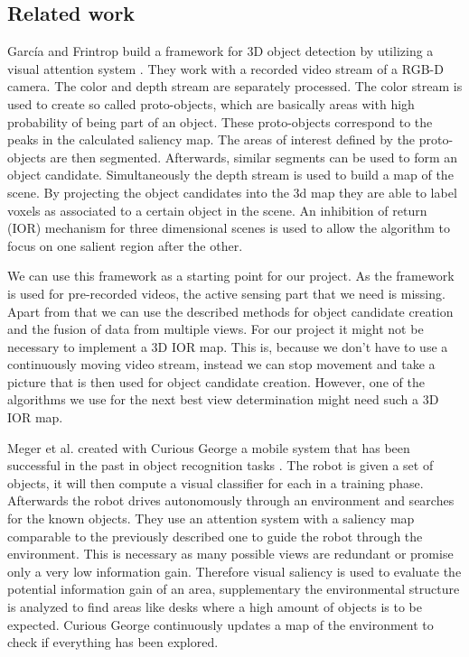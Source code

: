 \documentclass[a4paper,11pt,english]{article}
\begin{document}
\subsection{Related work}
García and Frintrop build a framework for 3D object detection by utilizing a visual attention system \cite{garcia2013computational}.
They work with a recorded video stream of a RGB-D camera. The color and depth stream are separately processed. 
The color stream is used to create so called proto-objects, which are basically areas with high probability of being part of an object. These proto-objects correspond to the peaks in the calculated saliency map. 
The areas of interest defined by the proto-objects are then segmented.
Afterwards, similar segments can be used to form an object candidate.
Simultaneously the depth stream is used to build a map of the scene.
By projecting the object candidates into the 3d map they are able to label voxels as associated to a certain object in the scene.
An inhibition of return (IOR) mechanism for three dimensional scenes is used to allow the algorithm to focus on one salient region after the other.

We can use this framework as a starting point for our project.
As the framework is used for pre-recorded videos, the active sensing part that we need is missing.
Apart from that we can use the described methods for object candidate creation and the fusion of data from multiple views.
For our project it might not be necessary to implement a 3D IOR map. This is, because we don't have to use a continuously moving video stream, instead we can stop movement and take a picture that is then used for object candidate creation. 
However, one of the algorithms we use for the next best view determination might need such a 3D IOR map.\medskip

Meger et al. created with Curious George a mobile system that has been successful in the past in object recognition tasks \cite{meger2010curious}.
The robot is given a set of objects, it will then compute a visual classifier for each in a training phase.
Afterwards the robot drives autonomously through an environment and searches for the known objects.
They use an attention system with a saliency map comparable to the previously described one to guide the robot through the environment. This is necessary as many possible views are redundant or promise only a very low information gain.
Therefore visual saliency is used to evaluate the potential information gain of an area, supplementary the environmental structure is analyzed to find areas like desks where a high amount of objects is to be expected.
Curious George continuously updates a map of the environment to check if everything has been explored.
\end{document}
